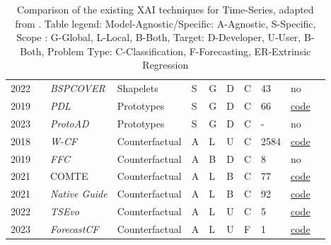 \begin{table*}[p]
\begin{tabular}{@{}lllllllllll@{}}
    2022        & \cite{li_efficient_2022}                   &\textit{\footnotesize{BSPCOVER}}  & Shapelets     & S      & G        & D      & C                    & 43               & no\\  

    2019        & \cite{gee_explaining_2019}        &\textit{PDL}       & Prototypes    &S       & G        & D      & C                    & 66                & \href{https://github.com/alangee/ijcai19-ts-prototypes}{code} \\ 

    2023        & \cite{li_prototypes_2023}          &\textit{ProtoAD}   & Prototypes     &S       & G        & D      & C                    & -                 & no \\

    2018        & \cite{wachter_counterfactual_2018} & \textit{W-CF} & Counterfactual    & A      & L         & U      & C & 2584 & \href{https://github.com/e-delaney/Instance-Based_CFE_TSC/tree/main/W-CF}{code}\\

    2019        & \cite{tonekaboni_explaining_2019}&\textit{FFC}& Counterfactual&A    & B          & D      & C                           & 8                & no \\ 

    2021    & \cite{ates_counterfactual_2021}   & COMTE                & Counterfactual    & A & L & B & C & 77 & \href{https://github.com/peaclab/CoMTE}{code} \\
    
    2021        & \cite{delaney_instance-based_2021} & \textit{\footnotesize{Native Guide}} & Counterfactual & A & L & B      & C & 92 & \href{https://github.com/e-delaney/Instance-Based_CFE_TSC/tree/main}{code} \\


    2022        & \cite{hollig_tsevo_2022}           & \textit{TSEvo}& Counterfactual           & A             & L             & U         & C                                 & 5                 & \href{https://github.com/fzi-forschungszentrum-informatik/TSInterpret}{code} \\
    2023 & \cite{wang_counterfactual_2023} & \textit{ForecastCF}& Counterfactual & A & L & U & F & 1 & \href{https://github.com/zhendong3wang/counterfactual-explanations-for-forecasting?tab=readme-ov-file}{code}\\


    \bottomrule
  \end{tabular}

  \caption{Comparison of the existing XAI techniques for Time-Series, adapted from \cite{rojat_explainable_2021}. Table legend: Model-Agnostic/Specific: A-Agnostic, S-Specific, Scope : G-Global, L-Local, B-Both, Target: D-Developer, U-User, B-Both, Problem Type: C-Classification, F-Forecasting, ER-Extrinsic Regression}
    \label{table:xai-survey}
\end{table*}

